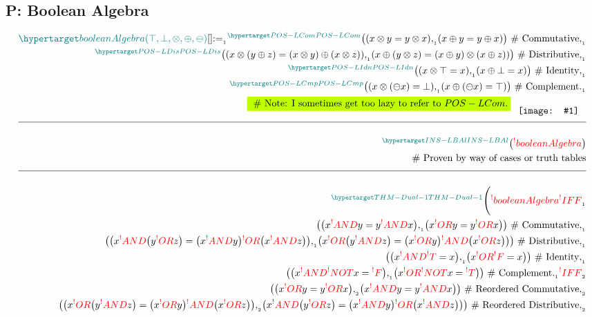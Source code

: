 \documentclass[a4paper]{article}
\makeatletter
\def\ml{\mleft}
\def\mr{\mright}
\newcommand*{\img}[1]{\phantom{\_} %
    \raisebox{-0.5\baselineskip}{%
        \texttt{[image: \#1]}%
    }%
\phantom{\_} }
\newcommand{\tdb}[1]{\colorbox{lime}{$\displaystyle #1$}}
\newcommand{\defeq}{:=}
\newcommand{\eq}{=}
\newcommand{\cusand}{,}
\newcommand{\cusend}{.}
\newcommand{\cusnum}[2]{{#1}_{{\phantom{ }}_{#2}}}
\newcommand{\eqComment}[1]{\text{  \# #1}}
\newcommand{\n}{\\[1.5ex] \hline \nonumber \\[0ex]}
\newcommand{\m}{\nonumber \\}
\newcommand\rfrlist[1]{%
    \forcsvlist{\rfrlist@item}{#1}
}
\newcommand\rfrlist@item[1]{\rfr{#1}\\}
\newcommand{\thmlink}[2]{{}_{\substack{\rfrlist{#1}}}^{\dfn{#2}} }
\makeatother
\begin{document}
\subsection{P: Boolean Algebra}
\begin{tcolorbox}
\begin{align}
    \dfn{booleanAlgebra} [\ml(\top, \bot, \otimes, \oplus, \ominus\mr)][] \cusnum{\defeq}{1} \thmlink{}{POS-LCom} \ml(\ml(x \otimes y \eq y \otimes x\mr) \cusnum{\cusand}{1} \ml(x \oplus y \eq y \oplus x\mr)\mr) \eqComment{Commutative} \cusnum{\cusand}{1}
\m \thmlink{}{POS-LDis} \ml(\ml(x \otimes \ml(y \oplus z\mr) \eq \ml(x \otimes y\mr) \oplus \ml(x \otimes z\mr)\mr) \cusnum{\cusand}{1} \ml(x \oplus \ml(y \otimes z\mr) \eq \ml(x \oplus y\mr) \otimes \ml(x \oplus z\mr)\mr)\mr) \eqComment{Distributive} \cusnum{\cusand}{1}
\m \thmlink{}{POS-LIdn} \ml(\ml(x \otimes \top \eq x\mr) \cusnum{\cusand}{1} \ml(x \oplus \bot \eq x\mr)\mr) \eqComment{Identity} \cusnum{\cusand}{1}
\m \thmlink{}{POS-LCmp} \ml(\ml(x \otimes \ml(\ominus x\mr) \eq \bot\mr) \cusnum{\cusand}{1} \ml(x \oplus \ml(\ominus x\mr) \eq \top\mr)\mr) \eqComment{Complement} \cusnum{\cusend}{1}
\m \tdb{\eqComment{Note: I sometimes get too lazy to refer to $POS-LCom$.}} \img{my-b.jpg} 
    \n \thmlink{}{INS-LBAl} \ml(\rfr{booleanAlgebra} [\rfr{T}, \rfr{F}, \rfr{AND}, \rfr{OR}, \rfr{NOT}][]\mr)
\m \eqComment{Proven by way of cases or truth tables}
    \n \thmlink{}{THM-Dual-1} \Bigg(\rfr{booleanAlgebra} [\ml(\rfr{T}, \rfr{F}, \rfr{AND}, \rfr{OR}, \rfr{NOT}\mr)][] \cusnum{\rfr{IFF}}{1}
\m \ml(\ml(x \rfr{AND} y \eq y \rfr{AND} x\mr) \cusnum{\cusand}{1} \ml(x \rfr{OR} y \eq y \rfr{OR} x\mr)\mr) \eqComment{Commutative} \cusnum{\cusand}{1}
\m \ml(\ml(x \rfr{AND} \ml(y \rfr{OR} z\mr) \eq \ml(x \rfr{AND} y\mr) \rfr{OR} \ml(x \rfr{AND} z\mr)\mr) \cusnum{\cusand}{1} \ml(x \rfr{OR} \ml(y \rfr{AND} z\mr) \eq \ml(x \rfr{OR} y\mr) \rfr{AND} \ml(x \rfr{OR} z\mr)\mr)\mr) \eqComment{Distributive} \cusnum{\cusand}{1}
\m \ml(\ml(x \rfr{AND} \rfr{T} \eq x\mr) \cusnum{\cusand}{1} \ml(x \rfr{OR} \rfr{F} \eq x\mr)\mr) \eqComment{Identity} \cusnum{\cusand}{1}
\m \ml(\ml(x \rfr{AND} \rfr{NOT} x \eq \rfr{F}\mr) \cusnum{\cusand}{1} \ml(x \rfr{OR} \rfr{NOT} x \eq \rfr{T}\mr)\mr) \eqComment{Complement} \cusnum{\cusend}{1} \cusnum{\rfr{IFF}}{2}
\m \ml(\ml(x \rfr{OR} y \eq y \rfr{OR} x\mr) \cusnum{\cusand}{2} \ml(x \rfr{AND} y \eq y \rfr{AND} x\mr)\mr) \eqComment{Reordered Commutative} \cusnum{\cusand}{2}
\m \ml(\ml(x \rfr{OR} \ml(y \rfr{AND} z\mr) \eq \ml(x \rfr{OR} y\mr) \rfr{AND} \ml(x \rfr{OR} z\mr)\mr) \cusnum{\cusand}{2} \ml(x \rfr{AND} \ml(y \rfr{OR} z\mr) \eq \ml(x \rfr{AND} y\mr) \rfr{OR} \ml(x \rfr{AND} z\mr)\mr)\mr) \eqComment{Reordered Distributive} \cusnum{\cusand}{2}

\end{align}
\end{tcolorbox}
\end{document}
